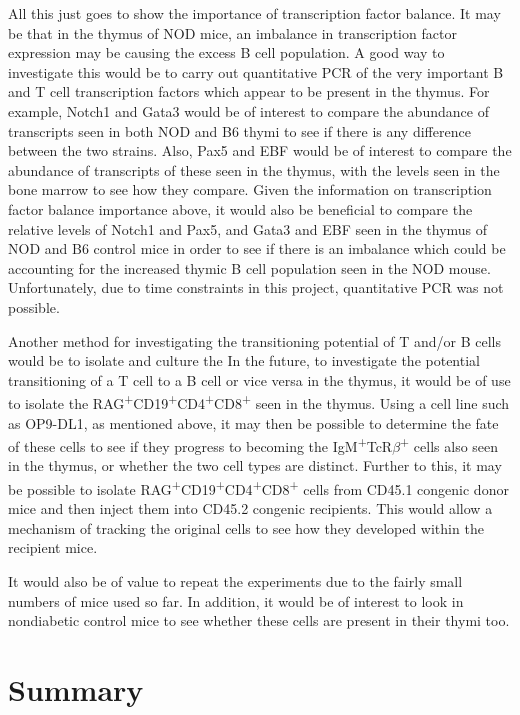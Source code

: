 All this just goes to show the importance of transcription factor balance.
It may be that in the thymus of NOD mice, an imbalance in transcription factor expression may be causing the excess B cell population.
A good way to investigate this would be to carry out quantitative PCR of the very important B and T cell transcription factors which appear to be present in the thymus.
For example, Notch1 and Gata3 would be of interest to compare the abundance of transcripts seen in both NOD and B6 thymi to see if there is any difference between the two strains.
Also, Pax5 and EBF would be of interest to compare the abundance of transcripts of these seen in the thymus, with the levels seen in the bone marrow to see how they compare.
Given the information on transcription factor balance importance above, it would also be beneficial to compare the relative levels of Notch1 and Pax5, and Gata3 and EBF seen in the thymus of NOD and B6 control mice in order to see if there is an imbalance which could be accounting for the increased thymic B cell population seen in the NOD mouse.
Unfortunately, due to time constraints in this project, quantitative PCR was not possible.


Another method for investigating the transitioning potential of T and/or B cells would be to isolate and culture the 
In the future, to investigate the potential transitioning of a T cell to a B cell or vice versa in the thymus, it would be of use to isolate the RAG\textsuperscript{+}CD19\textsuperscript{+}CD4\textsuperscript{+}CD8\textsuperscript{+} seen in the thymus.
Using a cell line such as OP9-DL1, as mentioned above, it may then be possible to determine the fate of these cells to see if they progress to becoming the IgM\textsuperscript{+}TcR$\beta$\textsuperscript{+} cells also seen in the thymus, or whether the two cell types are distinct.
Further to this, it may be possible to isolate RAG\textsuperscript{+}CD19\textsuperscript{+}CD4\textsuperscript{+}CD8\textsuperscript{+} cells from CD45.1 congenic donor mice and then inject them into CD45.2 congenic recipients.
This would allow a mechanism of tracking the original cells to see how they developed within the recipient mice.

It would also be of value to repeat the experiments due to the fairly small numbers of mice used so far.
In addition, it would be of interest to look in nondiabetic control mice to see whether these cells are present in their thymi too.



\section{Summary}

